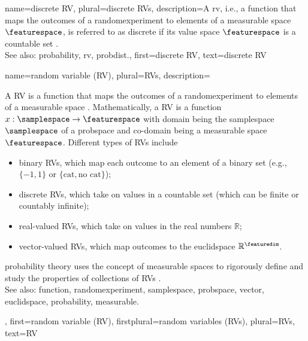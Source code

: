 {name={discrete RV}, 
  plural={discrete RVs},
 	description={A \gls{rv}, i.e., a \gls{function} that maps the 
		outcomes of a \gls{randomexperiment} to elements of a \gls{measurable} space $\featurespace$, 
		is referred to as discrete if its value space $\featurespace$ is a countable set \cite{BillingsleyProbMeasure}. 
			\\
		See also: \gls{probability}, \gls{rv}, \gls{probdist}.},
 	first={discrete RV},
 	text={discrete RV}  
}



{name={random variable (RV)}, plural={RVs},
 	description={A RV is a \gls{function} that maps the 
		outcomes of a \gls{randomexperiment} to elements of a \gls{measurable} space 
		\cite{BillingsleyProbMeasure,GrayProbBook}. 
 		Mathematically, a RV is a \gls{function} $x: \samplespace \rightarrow \featurespace$ 
		with domain being the \gls{samplespace} $\samplespace$ of a \gls{probspace} and 
		co-domain being a \gls{measurable} space $\featurespace$. 
 		Different types of RVs include  
 		\begin{itemize} 
 			\item {binary RVs}, which map each outcome to an element of a binary 
			set (e.g., $\{-1,1\}$ or $\{\text{cat}, \text{no cat}\}$); 
			\item {discrete RVs}, which take on values in a countable set (which can 
			be finite or countably infinite); 
 			\item {real-valued RVs}, which take on values in the real numbers $\mathbb{R}$;  
 			\item {\gls{vector}-valued RVs}, which map outcomes to the \gls{euclidspace} $\mathbb{R}^{\featuredim}$.  
 		\end{itemize} 
 		\Gls{probability} theory uses the concept of \gls{measurable} spaces to rigorously define 
 		and study the properties of collections of RVs \cite{BillingsleyProbMeasure}.
			\\
		See also: \gls{function}, \gls{randomexperiment}, \gls{samplespace}, \gls{probspace}, \gls{vector}, \gls{euclidspace}, \gls{probability}, \gls{measurable}.}, 
	first={random variable (RV)},
	firstplural={random variables (RVs)},
	plural={RVs},
	text={RV}  
}
 
